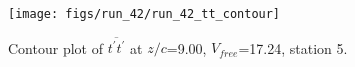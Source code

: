 \begin{figure}[H]
\centering
\texttt{[image: figs/run\_42/run\_42\_tt\_contour]}
\caption{Contour plot of $\overline{t^\prime t^\prime}$ at $z/c$=9.00, $V_{free}$=17.24, station 5.}
\label{fig:run_42_tt_contour}
\end{figure}


